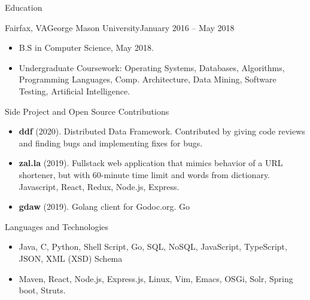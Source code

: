 \documentclass[]{mcdowellcv}
\begin{document}
	\begin{cvsection}{Education}
		\begin{cvsubsection}{Fairfax, VA}{George Mason University}{January 2016 -- May 2018}
			\begin{itemize}
				\item B.S in Computer Science, May 2018.
				\item Undergraduate Coursework: Operating Systems, Databases, Algorithms, Programming Languages, Comp. Architecture, Data Mining, Software Testing, Artificial Intelligence.
			\end{itemize}
		\end{cvsubsection}
	\end{cvsection}
	
	\begin{cvsection}{Side Project and Open Source Contributions}
		\begin{cvsubsection}{}{}{}
			\begin{itemize}
        \item \textbf{ddf} (2020). Distributed Data Framework. Contributed by giving code reviews and finding bugs and implementing fixes for bugs.
				\item \textbf{zal.la} (2019). Fullstack web application that mimics behavior of a URL shortener, but with 60-minute time limit and words from dictionary.  Javascript, React, Redux, Node.js, Express.
				\item \textbf{gdaw} (2019). Golang client for Godoc.org.  Go
			\end{itemize}
		\end{cvsubsection}
	\end{cvsection}
	
	\begin{cvsection}{Languages and Technologies}
		\begin{cvsubsection}{}{}{}	
			\begin{itemize}
				\item Java, C, Python, Shell Script, Go, SQL, NoSQL, JavaScript, TypeScript, JSON, XML (XSD) Schema 
				\item Maven, React, Node.js, Express.js, Linux, Vim, Emacs, OSGi, Solr, Spring boot, Struts.
			\end{itemize}
		\end{cvsubsection}
	\end{cvsection}
	
\end{document}
